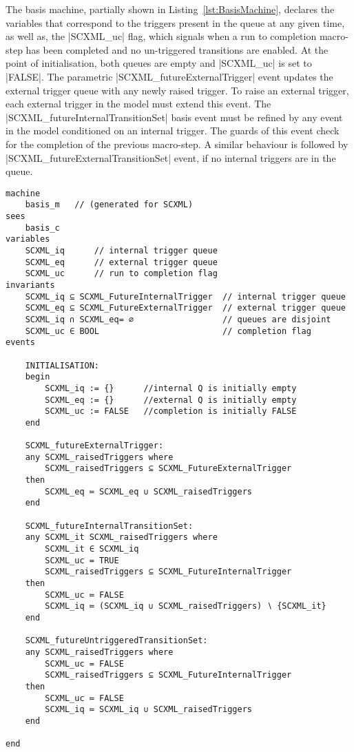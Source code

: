 The basis machine, partially shown in Listing~\ref{lst:BasisMachine}, declares the variables that correspond to the triggers present in the queue at any given time, as well as, the |SCXML_uc| flag, which signals when a run to completion macro-step has been completed and no un-triggered transitions are enabled. 
At the point of initialisation, both queues are empty and |SCXML_uc| is set to |FALSE|. 
The parametric |SCXML_futureExternalTrigger| event updates the external trigger queue with any newly raised trigger. 
To raise an external trigger, each external trigger in the model must extend this event.   
The |SCXML_futureInternalTransitionSet| basis event must be refined by any event in the model conditioned on an internal trigger. 
The guards of this event check for the completion of the previous macro-step. 
A similar behaviour is followed by |SCXML_futureExternalTransitionSet| event, if no internal triggers are in the queue.  

\begin{lstfloat}[!tb]
\begin{lstlisting}[caption={Snippet of abstract basis machine}, label={lst:BasisMachine},language=Event-B, escapechar=|, frame=single, basicstyle=\rmfamily\scriptsize]
machine 
	basis_m   // (generated for SCXML)
sees 
	basis_c 
variables
	SCXML_iq	  // internal trigger queue
	SCXML_eq	  // external trigger queue
	SCXML_uc	  // run to completion flag
invariants
	SCXML_iq ⊆ SCXML_FutureInternalTrigger	// internal trigger queue
	SCXML_eq ⊆ SCXML_FutureExternalTrigger	// external trigger queue
	SCXML_iq ∩ SCXML_eq= ∅					// queues are disjoint
	SCXML_uc ∈ BOOL							// completion flag
events

	INITIALISATION: 
	begin
		SCXML_iq := {}		//internal Q is initially empty
		SCXML_eq := {}		//external Q is initially empty
		SCXML_uc := FALSE	//completion is initially FALSE
	end

	SCXML_futureExternalTrigger: 
	any SCXML_raisedTriggers where
		SCXML_raisedTriggers ⊆ SCXML_FutureExternalTrigger 
	then
		SCXML_eq ≔ SCXML_eq ∪ SCXML_raisedTriggers 
	end

	SCXML_futureInternalTransitionSet: 
	any SCXML_it SCXML_raisedTriggers where
		SCXML_it ∈ SCXML_iq 
		SCXML_uc = TRUE 
		SCXML_raisedTriggers ⊆ SCXML_FutureInternalTrigger 
	then
		SCXML_uc ≔ FALSE 
		SCXML_iq ≔ (SCXML_iq ∪ SCXML_raisedTriggers) ∖ {SCXML_it} 
	end

	SCXML_futureUntriggeredTransitionSet: 
	any SCXML_raisedTriggers where
		SCXML_uc = FALSE
		SCXML_raisedTriggers ⊆ SCXML_FutureInternalTrigger
	then
		SCXML_uc ≔ FALSE 
		SCXML_iq ≔ SCXML_iq ∪ SCXML_raisedTriggers 
	end

end
\end{lstlisting}
\end{lstfloat}

